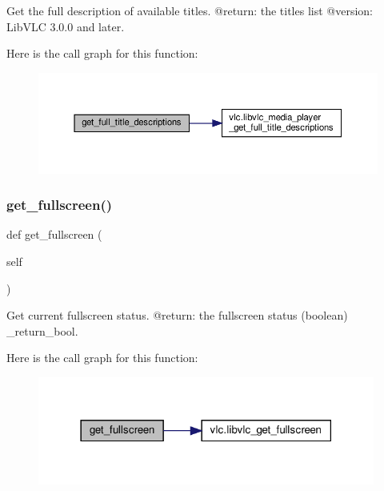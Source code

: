 \begin{DoxyVerb}Get the full description of available titles.
@return: the titles list
@version: LibVLC 3.0.0 and later.
\end{DoxyVerb}
 Here is the call graph for this function\+:
\nopagebreak
\begin{figure}[H]
\begin{center}
\leavevmode
\includegraphics[width=350pt]{classvlc_1_1_media_player_a13b7b90ec73fb26fadf694e95c06659e_cgraph}
\end{center}
\end{figure}
\mbox{\label{classvlc_1_1_media_player_a6493f70d58a5ac4a276d9ce2ea5922bd}} 
\subsubsection{\texorpdfstring{get\+\_\+fullscreen()}{get\_fullscreen()}}
{\footnotesize\ttfamily def get\+\_\+fullscreen (\begin{DoxyParamCaption}\item[{}]{self }\end{DoxyParamCaption})}

\begin{DoxyVerb}Get current fullscreen status.
@return: the fullscreen status (boolean) \libvlc_return_bool.
\end{DoxyVerb}
 Here is the call graph for this function\+:
\nopagebreak
\begin{figure}[H]
\begin{center}
\leavevmode
\includegraphics[width=314pt]{classvlc_1_1_media_player_a6493f70d58a5ac4a276d9ce2ea5922bd_cgraph}
\end{center}
\end{figure}
\mbox{\label{classvlc_1_1_media_player_af545adff837a9f6c8bfd31b70854cde7}} 
